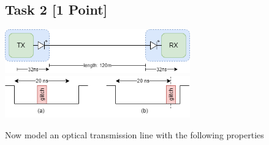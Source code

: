 \documentclass[12pt,epsf,makeidx,oneside]{book}
\begin{document}
\subsection{Task 2 [1 Point]}
\begin{center}
  \includegraphics[width=0.6\textwidth]{optical} \\
  \vspace*{0.5cm}
  \includegraphics[width=0.6\textwidth]{glitches}
\end{center}
Now model an optical transmission line with the following properties
\end{document}
